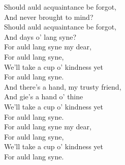 \documentclass[a6paper, 10pt, twoside]{article}
\begin{document}
\begin{center}
\end{center}
\begin{lyrics}
Should auld acquaintance be forgot, \\
And never brought to mind? \\
Should auld acquaintance be forgot, \\
And days o' lang syne? \\
For auld lang syne my dear, \\
For auld lang syne, \\
We'll take a cup o' kindness yet \\
For auld lang syne.
\vspace{10pt}\\
And there's a hand, my trusty friend, \\
And gie's a hand o' thine \\
We'll take a cup o' kindness yet \\
For auld lang syne. \\
For auld lang syne my dear, \\
For auld lang syne, \\
We'll take a cup o' kindness yet \\
For auld lang syne.
\end{lyrics}
\end{document}

